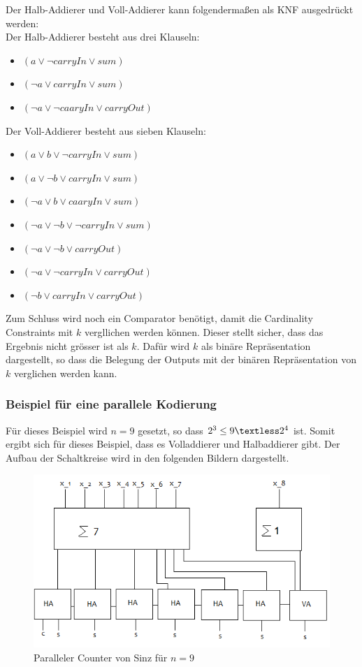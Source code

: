 \documentclass[a4,abstract=on]{scrartcl}
\begin{document}
Der Halb-Addierer und Voll-Addierer kann folgendermaßen als KNF ausgedrückt werden:\\
Der Halb-Addierer besteht aus drei Klauseln:
\begin{itemize}
\item $(a \vee \neg carryIn \vee sum)$
\item $(\neg a \vee carryIn \vee sum)$
\item $(\neg a \vee \neg caaryIn \vee carryOut )$
\end{itemize}

Der Voll-Addierer besteht aus sieben Klauseln:
\begin{itemize}
\item $(a \vee b \vee \neg carryIn \vee sum)$
\item $( a \vee \neg b \vee carryIn \vee sum)$
\item $(\neg a \vee b \vee caaryIn \vee sum )$
\item $(\neg a \vee \neg b \vee \neg carryIn \vee sum)$
\item$(\neg a \vee \neg b \vee carryOut)$
\item$(\neg a \vee \neg carryIn \vee carryOut)$
\item$(\neg b \vee carryIn \vee carryOut)$
\end{itemize}

Zum Schluss wird noch ein Comparator benötigt, damit die Cardinality Constraints mit $k$ vergllichen werden können. Dieser stellt sicher, dass das Ergebnis nicht grösser ist als $k$. Dafür wird $k$ als binäre Repräsentation dargestellt, so dass die Belegung der Outputs mit der binären Repräsentation von $k$ verglichen werden kann.

\subsubsection{Beispiel für eine parallele Kodierung}
Für dieses Beispiel wird $n=9$ gesetzt, so dass $2^3 \leq 9 \textless 2^4$ ist. Somit ergibt sich für dieses Beispiel, dass es Volladdierer und Halbaddierer gibt. Der Aufbau der Schaltkreise wird in den folgenden Bildern dargestellt.

\begin{figure}[H]
\centering
\includegraphics[width=\textwidth]{Bsp_Sinz_grob.png}
\caption{Paralleler Counter von Sinz für $n=9$}
\label{fig:sinz_counter_para_bsp}
\end{figure}
\end{document}
